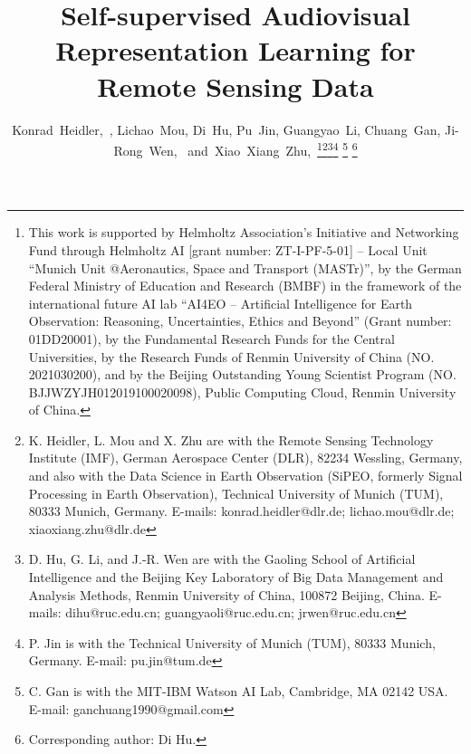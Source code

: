 \documentclass[journal]{IEEEtran}
\begin{document}
\title{Self-supervised Audiovisual Representation Learning for Remote Sensing Data}

\author{Konrad~Heidler,~,
        Lichao~Mou,
        Di~Hu,
        Pu~Jin,
        Guangyao~Li,
        Chuang~Gan,
        Ji-Rong~Wen,~
        and~Xiao~Xiang~Zhu,~\thanks{
  This work is supported by Helmholtz Association’s Initiative and
  Networking Fund through Helmholtz AI [grant number: ZT-I-PF-5-01] --
  Local Unit ``Munich Unit @Aeronautics, Space and Transport (MASTr)'',
  by the German Federal Ministry of Education and Research (BMBF)
  in the framework of the international future AI lab
  ``AI4EO -- Artificial Intelligence for Earth Observation: Reasoning,
  Uncertainties, Ethics and Beyond'' (Grant number: 01DD20001),
  by the Fundamental Research Funds for the Central Universities, 
  by the Research Funds of Renmin University of China (NO. 2021030200), 
  and by the Beijing Outstanding Young Scientist Program (NO. BJJWZYJH012019100020098), Public Computing Cloud, Renmin University of China.
}\thanks{K. Heidler, L. Mou and X. Zhu are with the Remote Sensing Technology Institute (IMF),
  German Aerospace Center (DLR), 82234 Wessling, Germany,
  and also with the Data Science in Earth Observation
  (SiPEO, formerly Signal Processing in Earth Observation),
  Technical University of Munich (TUM),
  80333 Munich, Germany.
  E-mails: konrad.heidler@dlr.de; lichao.mou@dlr.de; xiaoxiang.zhu@dlr.de}\thanks{D. Hu, G. Li, and J.-R. Wen are with the
  Gaoling School of Artificial Intelligence and the
  Beijing Key Laboratory of Big Data Management and Analysis Methods,
  Renmin University of China,
  100872 Beijing, China.
  E-mails: dihu@ruc.edu.cn; guangyaoli@ruc.edu.cn; jrwen@ruc.edu.cn
}\thanks{P. Jin is with the Technical University of Munich (TUM),
    80333 Munich, Germany.
    E-mail: pu.jin@tum.de
}
\thanks{C. Gan is with the MIT-IBM Watson AI Lab, Cambridge, MA 02142 USA.
    E-mail: ganchuang1990@gmail.com
}
\thanks{Corresponding author: Di Hu.
}
}
\end{document}
